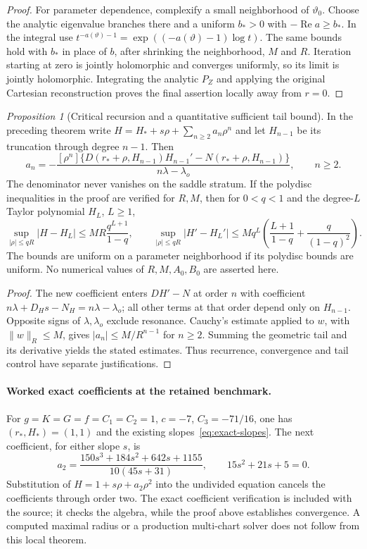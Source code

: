 \documentclass[12pt,a4paper,oneside]{report}
\numberwithin{equation}{chapter}
\theoremstyle{remark}\newtheorem{remark}[theorem]{Remark}
\newtheorem{suppprop}{Proposition}[chapter]
\begin{document}
\begin{proof}
For parameter dependence, complexify a small neighborhood of
$\vartheta_0$. Choose the analytic eigenvalue branches there and a uniform
$b_*>0$ with $-\operatorname{Re}a\ge b_*$. In the integral use
$t^{-a(\vartheta)-1}=\exp((-a(\vartheta)-1)\log t)$.
The same bounds hold with $b_*$ in place of $b$, after shrinking the
neighborhood, $M$ and $R$. Iteration starting at zero is jointly holomorphic
and converges uniformly, so its limit is jointly holomorphic. Integrating
the analytic $P_Z$ and applying the original Cartesian reconstruction proves
the final assertion locally away from $r=0$.
\end{proof}

\begin{suppprop}[Critical recursion and a quantitative sufficient tail bound]
\label{prop:critical-tail}
In the preceding theorem write
$H=H_*+s\rho+\sum_{n\ge2}a_n\rho^n$ and let $H_{n-1}$ be its truncation
through degree $n-1$. Then
\[
 a_n=-\frac{[\rho^n]\{D(r_*+\rho,H_{n-1})H_{n-1}'
                         -N(r_*+\rho,H_{n-1})\}}
                  {n\lambda-\lambda_o},\qquad n\ge2.
\]
The denominator never vanishes on the saddle stratum. If the polydisc
inequalities in the proof are verified for $R,M$, then for $0<q<1$ and
the degree-$L$ Taylor polynomial $H_L$, $L\ge1$,
\[
 \sup_{|\rho|\le qR}|H-H_L|
 \le MR\frac{q^{L+1}}{1-q},\qquad
 \sup_{|\rho|\le qR}|H'-H_L'|
 \le M q^L\left(\frac{L+1}{1-q}+\frac{q}{(1-q)^2}\right).
\]
The bounds are uniform on a parameter neighborhood if its polydisc bounds
are uniform. No numerical values of $R,M,A_0,B_0$ are asserted here.
\end{suppprop}
\begin{proof}
The new coefficient enters $DH'-N$ at order $n$ with coefficient
$n\lambda+D_Hs-N_H=n\lambda-\lambda_o$; all other terms at that order
depend only on $H_{n-1}$. Opposite signs of $\lambda,\lambda_o$ exclude
resonance. Cauchy's estimate applied to $w$, with $\|w\|_R\le M$,
gives $|a_n|\le M/R^{n-1}$ for $n\ge2$. Summing the geometric tail and its
derivative yields the stated estimates. Thus recurrence, convergence and
tail control have separate justifications.
\end{proof}

\paragraph{Worked exact coefficients at the retained benchmark.}
For $g=K=G=f=C_1=C_2=1$, $c=-7$, $C_3=-71/16$, one has
$(r_*,H_*)=(1,1)$ and the existing slopes~\eqref{eq:exact-slopes}.
The next coefficient, for either slope $s$, is
\[
 a_2=\frac{150s^3+184s^2+642s+1155}{10(45s+31)},\qquad
 15s^2+21s+5=0.
\]
Substitution of $H=1+s\rho+a_2\rho^2$ into the undivided equation cancels
the coefficients through order two. The exact coefficient verification is
included with the source; it checks the algebra, while the proof above
establishes convergence. A computed maximal radius or a production
multi-chart solver does not follow from this local theorem.
\end{document}
